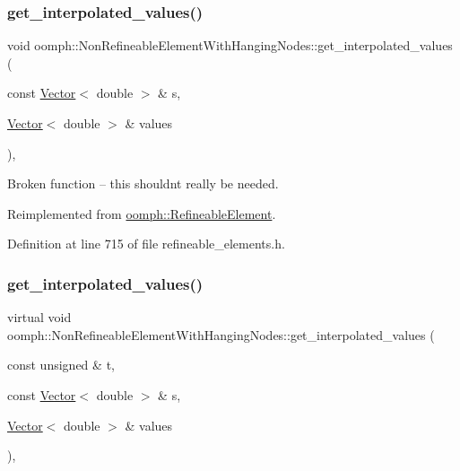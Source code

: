 \subsubsection{\texorpdfstring{get\+\_\+interpolated\+\_\+values()}{get\_interpolated\_values()}\hspace{0.1cm}{\footnotesize\ttfamily [1/2]}}
{\footnotesize\ttfamily void oomph\+::\+Non\+Refineable\+Element\+With\+Hanging\+Nodes\+::get\+\_\+interpolated\+\_\+values (\begin{DoxyParamCaption}\item[{const \hyperlink{classoomph_1_1Vector}{Vector}$<$ double $>$ \&}]{s,  }\item[{\hyperlink{classoomph_1_1Vector}{Vector}$<$ double $>$ \&}]{values }\end{DoxyParamCaption})\hspace{0.3cm}{\ttfamily [inline]}, {\ttfamily [virtual]}}



Broken function -- this shouldn\textquotesingle{}t really be needed. 



Reimplemented from \hyperlink{classoomph_1_1RefineableElement_ad9a4f92880668a2373326d8306365c43}{oomph\+::\+Refineable\+Element}.



Definition at line 715 of file refineable\+\_\+elements.\+h.

\mbox{\label{classoomph_1_1NonRefineableElementWithHangingNodes_a864c5d93b38c49401561db85bb545e27}} 
\subsubsection{\texorpdfstring{get\+\_\+interpolated\+\_\+values()}{get\_interpolated\_values()}\hspace{0.1cm}{\footnotesize\ttfamily [2/2]}}
{\footnotesize\ttfamily virtual void oomph\+::\+Non\+Refineable\+Element\+With\+Hanging\+Nodes\+::get\+\_\+interpolated\+\_\+values (\begin{DoxyParamCaption}\item[{const unsigned \&}]{t,  }\item[{const \hyperlink{classoomph_1_1Vector}{Vector}$<$ double $>$ \&}]{s,  }\item[{\hyperlink{classoomph_1_1Vector}{Vector}$<$ double $>$ \&}]{values }\end{DoxyParamCaption})\hspace{0.3cm}{\ttfamily [inline]}, {\ttfamily [virtual]}}



